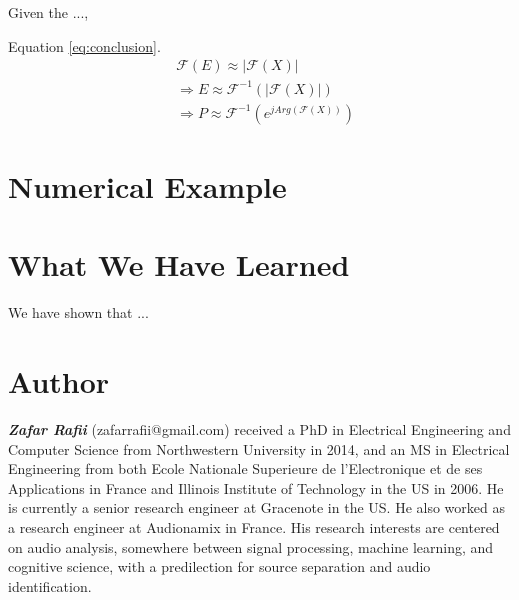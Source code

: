 \documentclass[journal]{IEEEtran}
\begin{document}
Given the ..., 

Equation \ref{eq:conclusion}.
\begin{equation}
\label{eq:conclusion}
\begin{split}
&\mathcal{F}(E) \approx |\mathcal{F}(X)| \\
&\Rightarrow E \approx \mathcal{F}^{-1}(|\mathcal{F}(X)|) \\
&\Rightarrow P \approx \mathcal{F}^{-1}(e^{j Arg(\mathcal{F}(X))})
\end{split}
\end{equation}



\section{Numerical Example} %




\section{What We Have Learned}

We have shown that ...




\section{Author}

\textit{\textbf{Zafar Rafii}} (zafarrafii@gmail.com) received a PhD in Electrical Engineering and Computer Science from Northwestern University in 2014, and an MS in Electrical Engineering from both Ecole Nationale Superieure de l’Electronique et de ses Applications in France and Illinois Institute of Technology in the US in 2006. He is currently a senior research engineer at Gracenote in the US. He also worked as a research engineer at Audionamix in France. His research interests are centered on audio analysis, somewhere between signal processing, machine learning, and cognitive science, with a predilection for source separation and audio identification.



\end{document}
